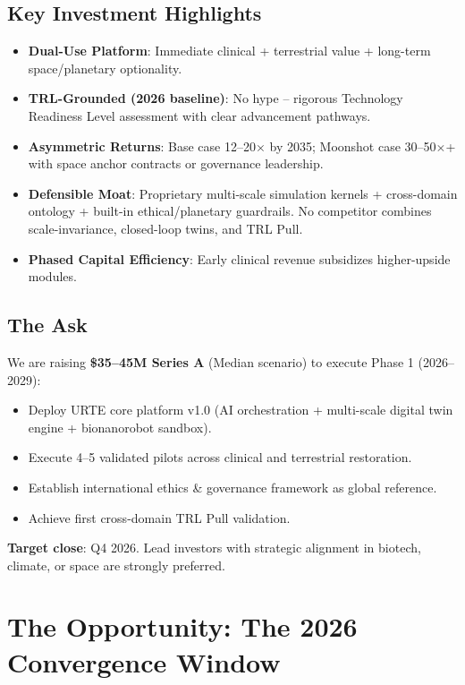 \documentclass[11pt,a4paper]{article}
\begin{document}
\subsection{Key Investment Highlights}
\begin{itemize}
    \item \textbf{Dual-Use Platform}: Immediate clinical + terrestrial value + long-term space/planetary optionality.
    \item \textbf{TRL-Grounded (2026 baseline)}: No hype -- rigorous Technology Readiness Level assessment with clear advancement pathways.
    \item \textbf{Asymmetric Returns}: Base case 12--20$\times$ by 2035; Moonshot case 30--50$\times$+ with space anchor contracts or governance leadership.
    \item \textbf{Defensible Moat}: Proprietary multi-scale simulation kernels + cross-domain ontology + built-in ethical/planetary guardrails. No competitor combines scale-invariance, closed-loop twins, and TRL Pull.
    \item \textbf{Phased Capital Efficiency}: Early clinical revenue subsidizes higher-upside modules.
\end{itemize}

\subsection{The Ask}
We are raising \textbf{\$35--45M Series A} (Median scenario) to execute Phase 1 (2026--2029):
\begin{itemize}
    \item Deploy URTE core platform v1.0 (AI orchestration + multi-scale digital twin engine + bionanorobot sandbox).
    \item Execute 4--5 validated pilots across clinical and terrestrial restoration.
    \item Establish international ethics \& governance framework as global reference.
    \item Achieve first cross-domain TRL Pull validation.
\end{itemize}

\textbf{Target close}: Q4 2026. Lead investors with strategic alignment in biotech, climate, or space are strongly preferred.

\section{The Opportunity: The 2026 Convergence Window}
\end{document}
